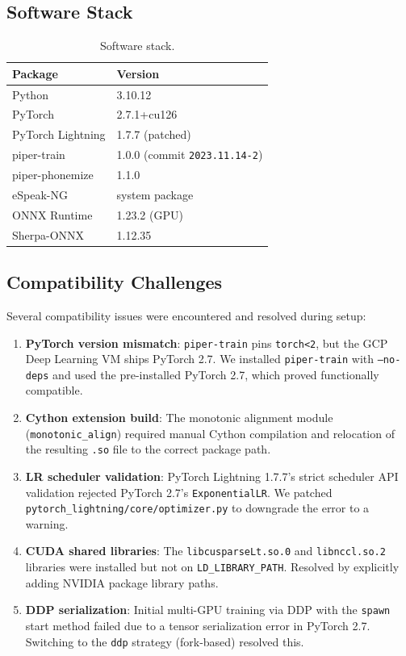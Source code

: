 \documentclass[10pt,a4paper,twocolumn]{article}
\begin{document}
\subsection{Software Stack}

\begin{table}[ht]
\centering
\begin{tabular}{@{}ll@{}}
\toprule
Package & Version \\
\midrule
Python & 3.10.12 \\
PyTorch & 2.7.1+cu126 \\
PyTorch Lightning & 1.7.7 (patched) \\
piper-train & 1.0.0 (commit \texttt{2023.11.14-2}) \\
piper-phonemize & 1.1.0 \\
eSpeak-NG & system package \\
ONNX Runtime & 1.23.2 (GPU) \\
Sherpa-ONNX & 1.12.35 \\
\bottomrule
\end{tabular}
\caption{Software stack.}
\label{tab:software}
\end{table}

\subsection{Compatibility Challenges}

Several compatibility issues were encountered and resolved during setup:

\begin{enumerate}
    \item \textbf{PyTorch version mismatch}: \texttt{piper-train} pins \texttt{torch<2}, but the GCP Deep Learning VM ships PyTorch 2.7. We installed \texttt{piper-train} with \texttt{--no-deps} and used the pre-installed PyTorch 2.7, which proved functionally compatible.

    \item \textbf{Cython extension build}: The monotonic alignment module (\texttt{monotonic\_align}) required manual Cython compilation and relocation of the resulting \texttt{.so} file to the correct package path.

    \item \textbf{LR scheduler validation}: PyTorch Lightning 1.7.7's strict scheduler API validation rejected PyTorch 2.7's \texttt{ExponentialLR}. We patched \texttt{pytorch\_lightning/core/optimizer.py} to downgrade the error to a warning.

    \item \textbf{CUDA shared libraries}: The \texttt{libcusparseLt.so.0} and \texttt{libnccl.so.2} libraries were installed but not on \texttt{LD\_LIBRARY\_PATH}. Resolved by explicitly adding NVIDIA package library paths.

    \item \textbf{DDP serialization}: Initial multi-GPU training via DDP with the \texttt{spawn} start method failed due to a tensor serialization error in PyTorch 2.7. Switching to the \texttt{ddp} strategy (fork-based) resolved this.
\end{enumerate}
\end{document}
